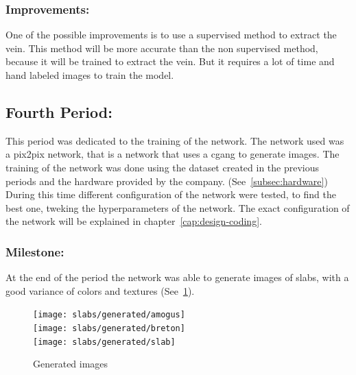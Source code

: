 \subsubsection{Improvements:}
One of the possible improvements is to use a supervised method to extract the vein.
This method will be more accurate than the non supervised method, because it will be trained to extract the vein.
But it requires a lot of time and hand labeled images to train the model.
\subsection{Fourth Period:}
This period was dedicated to the training of the network.
The network used was a pix2pix network, that is a network that uses a \gls{cgang} to generate images.
The training of the network was done using the dataset created in the previous periods and the hardware provided by the company. (See~\ref{subsec:hardware})
During this time different configuration of the network were tested, to find the best one, tweking the hyperparameters of the network.
The exact configuration of the network will be explained in chapter~\ref{cap:design-coding}.
\subsubsection{Milestone:}
At the end of the period the network was able to generate images of slabs, with a good variance of colors and textures (See~\ref*{fig:gen-images}).
\begin{figure}
    \centering
    \texttt{[image: slabs/generated/amogus]}
    \\
    \texttt{[image: slabs/generated/breton]}
    \\
    \texttt{[image: slabs/generated/slab]}
    \caption{Generated images}\label{fig:gen-images}
\end{figure}